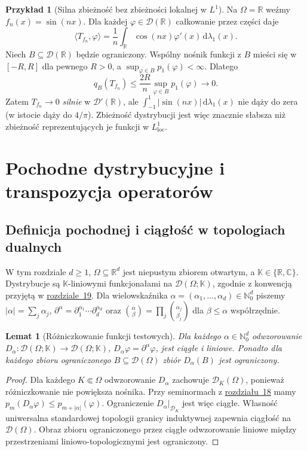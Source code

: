 \documentclass[11pt,a4paper]{article}
\numberwithin{equation}{section}
\theoremstyle{plain}
\newtheorem{lemat}[twierdzenie]{Lemat}
\theoremstyle{definition}
\newtheorem{przyklad}[twierdzenie]{Przykład}
\theoremstyle{remark}
\newcommand{\R}{\mathbb R}
\newcommand{\C}{\mathbb C}
\newcommand{\N}{\mathbb N}
\newcommand{\K}{\mathbb K}
\begin{document}
\begin{przyklad}[Silna zbieżność bez zbieżności lokalnej w $L^1$]
\label{ex:oscillations19}
Na $\Omega=\R$ weźmy $f_n(x)=\sin(nx)$.
Dla każdej $\varphi\in\mathcal D(\R)$ całkowanie przez części daje
\[\langle T_{f_n},\varphi\rangle=
\frac1n\int_\R\cos(nx)\varphi'(x)\,
\mathrm d\lambda_1(x).\]
Niech $B\subseteq\mathcal D(\R)$ będzie ograniczony.
Wspólny nośnik funkcji z $B$ mieści się w $[-R,R]$
dla pewnego $R>0$, a $\sup_{\varphi\in B}p_1(\varphi)<\infty$.
Dlatego
\[q_B(T_{f_n})\le\frac{2R}{n}
\sup_{\varphi\in B}p_1(\varphi)\longrightarrow0.\]
Zatem $T_{f_n}\to0$ \emph{silnie} w $\mathcal D'(\R)$,
ale $\int_{-1}^1|\sin(nx)|\,\mathrm d\lambda_1(x)$
nie dąży do zera (w istocie dąży do $4/\pi$).
Zbieżność dystrybucji jest więc znacznie słabsza niż
zbieżność reprezentujących je funkcji w $L^1_{\mathrm{loc}}$.
\end{przyklad}


\setcounter{section}{19}
\section{Pochodne dystrybucyjne i transpozycja operatorów}
\label{sec:pochodne20}

\subsection{Definicja pochodnej i ciągłość w topologiach dualnych}

W tym rozdziale $d\ge1$, $\Omega\subseteq\R^d$ jest niepustym
zbiorem otwartym, a $\K\in\{\R,\C\}$. Dystrybucje są
$\K$-liniowymi funkcjonałami na $\mathcal D(\Omega;\K)$, zgodnie
z konwencją przyjętą w \hyperref[sec:dystrybucje19]{rozdziale~19}.
Dla wielowskaźnika $\alpha=(\alpha_1,\ldots,\alpha_d)\in\N_0^d$
piszemy $|\alpha|=\sum_j\alpha_j$,
$\partial^\alpha=\partial_1^{\alpha_1}\cdots\partial_d^{\alpha_d}$
oraz $\binom\alpha\beta=\prod_j\binom{\alpha_j}{\beta_j}$
dla $\beta\le\alpha$ współrzędnie.

\begin{lemat}[Różniczkowanie funkcji testowych]
\label{lem:test-derivative20}
Dla każdego $\alpha\in\N_0^d$ odwzorowanie
$D_\alpha:\mathcal D(\Omega;\K)\to\mathcal D(\Omega;\K)$,
$D_\alpha\varphi=\partial^\alpha\varphi$, jest ciągłe i liniowe.
Ponadto dla każdego zbioru ograniczonego $B\subseteq\mathcal D(\Omega)$
zbiór $D_\alpha(B)$ jest ograniczony.
\end{lemat}
\begin{proof}
Dla każdego $K\Subset\Omega$ odwzorowanie $D_\alpha$ zachowuje
$\mathcal D_K(\Omega)$, ponieważ różniczkowanie nie powiększa nośnika.
Przy seminormach z \hyperref[sec:funkcje-testowe18]{rozdziału~18} mamy
$p_m(D_\alpha\varphi)\le p_{m+|\alpha|}(\varphi)$.
Ograniczenie $D_\alpha|_{\mathcal D_K}$ jest więc ciągłe.
Własność uniwersalna standardowej topologii granicy induktywnej
zapewnia ciągłość na $\mathcal D(\Omega)$. Obraz zbioru ograniczonego
przez ciągłe odwzorowanie liniowe między przestrzeniami
liniowo-topologicznymi jest ograniczony.
\end{proof}
\end{document}

